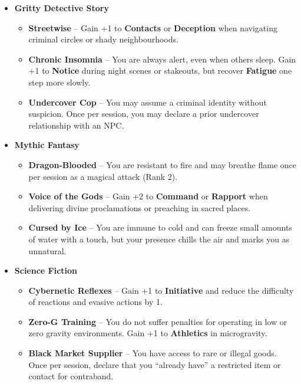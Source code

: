 \begin{itemize}
    \item \textbf{Gritty Detective Story}
    \begin{itemize}
        \item \textbf{Streetwise} – Gain +1 to \textbf{Contacts} or \textbf{Deception} when navigating criminal circles or shady neighbourhoods.
        \item \textbf{Chronic Insomnia} – You are always alert, even when others sleep. Gain +1 to \textbf{Notice} during night scenes or stakeouts, but recover \textbf{Fatigue} one step more slowly.
        \item \textbf{Undercover Cop} – You may assume a criminal identity without suspicion. Once per session, you may declare a prior undercover relationship with an NPC.
    \end{itemize}

    \item \textbf{Mythic Fantasy}
    \begin{itemize}
        \item \textbf{Dragon-Blooded} – You are resistant to fire and may breathe flame once per session as a magical attack (Rank 2).
        \item \textbf{Voice of the Gods} – Gain +2 to \textbf{Command} or \textbf{Rapport} when delivering divine proclamations or preaching in sacred places.
        \item \textbf{Cursed by Ice} – You are immune to cold and can freeze small amounts of water with a touch, but your presence chills the air and marks you as unnatural.
    \end{itemize}

    \item \textbf{Science Fiction}
    \begin{itemize}
        \item \textbf{Cybernetic Reflexes} – Gain +1 to \textbf{Initiative} and reduce the difficulty of reactions and evasive actions by 1.
        \item \textbf{Zero-G Training} – You do not suffer penalties for operating in low or zero gravity environments. Gain +1 to \textbf{Athletics} in microgravity.
        \item \textbf{Black Market Supplier} – You have access to rare or illegal goods. Once per session, declare that you “already have” a restricted item or contact for contraband.
    \end{itemize}
\end{itemize}

